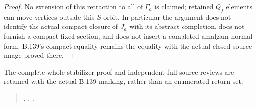 \begin{proof}
No extension of this retraction to all of $\Gamma_a$ is claimed;
retained $Q_f$ elements can move vertices outside this $S$ orbit.
In particular the argument does not identify the actual compact closure
of $J_a$ with its abstract completion, does not furnish a compact
fixed section, and does not insert a completed amalgam normal form.
B.139's compact equality remains the equality with the actual closed
source image proved there.
\end{proof}

The complete whole-stabilizer proof and independent full-source reviews
are retained with the actual B.139 marking, rather than an enumerated
return set:
\begin{quote}\footnotesize\raggedright
{},
,
.
\end{quote}
